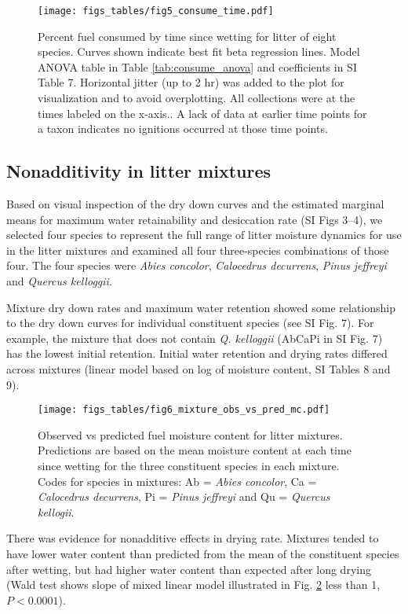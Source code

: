 \documentclass[letterpaper,12pt]{article}
\begin{document}
\begin{figure}[h]
  \centering
\texttt{[image: figs\_tables/fig5\_consume\_time.pdf]}
\caption{Percent fuel consumed by time since wetting for litter of eight
  species. Curves shown indicate best fit beta regression lines. Model ANOVA
  table in Table \ref{tab:consume_anova} and coefficients in SI Table 7.
  Horizontal jitter (up to 2 hr) was added to the plot for visualization and to
  avoid overplotting. All collections were at the times labeled on the x-axis..
  A lack of data at earlier time points for a taxon indicates no ignitions
  occurred at those time points.}
  \label{fig:consume_time}
\end{figure}


\subsection*{Nonadditivity in  litter mixtures}

Based on visual inspection of the dry down curves and the estimated marginal
means for maximum water retainability and desiccation rate (SI Figs 3--4), we
selected four species to represent the full range of litter moisture dynamics
for use in the litter mixtures and examined all four three-species combinations
of those four. The four species were \emph{Abies concolor}, \emph{Calocedrus
  decurrens}, \emph{Pinus jeffreyi} and \emph{Quercus kelloggii}.

Mixture dry down rates and maximum water retention showed some relationship to
the dry down curves for individual constituent species (see SI Fig. 7). For
example, the mixture that does not contain \emph{Q. kelloggii} (AbCaPi in SI
Fig. 7) has the lowest initial retention. Initial water retention and drying
rates differed across mixtures (linear model based on log of moisture content,
SI Tables 8 and 9).


\begin{figure}[h]
  \centering
\texttt{[image: figs\_tables/fig6\_mixture\_obs\_vs\_pred\_mc.pdf]}
\caption{Observed vs predicted fuel moisture content for litter mixtures.
  Predictions are based on the mean moisture content at each time since wetting
  for the three constituent species in each mixture. Codes for species in
  mixtures: Ab = \emph{Abies concolor}, Ca = \emph{Calocedrus decurrens}, Pi =
  \emph{Pinus jeffreyi} and Qu = \emph{Quercus kellogii}.}
  \label{fig:mixture_obs_pred_mc}
\end{figure}


There was evidence for nonadditive effects in drying rate. Mixtures tended to
have lower water content than predicted from the mean of the constituent
species after wetting, but had higher water content than expected after long
drying (Wald test shows slope of mixed linear model illustrated in Fig.
\ref{fig:mixture_obs_pred_mc} less than 1, $P < 0.0001$).
\end{document}
